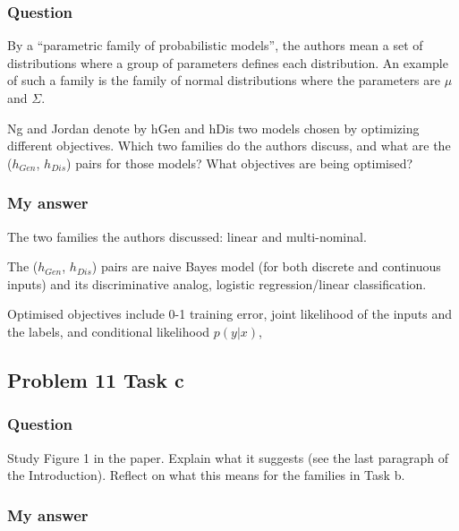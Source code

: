 \documentclass[
]{article}
\begin{document}
\hypertarget{question-6}{%
\subsubsection{Question}\label{question-6}}

By a ``parametric family of probabilistic models'', the authors mean a
set of distributions where a group of parameters defines each
distribution. An example of such a family is the family of normal
distributions where the parameters are \(\mu\) and \(\Sigma\).

Ng and Jordan denote by hGen and hDis two models chosen by optimizing
different objectives. Which two families do the authors discuss, and
what are the (\(h_{Gen}\), \(h_{Dis}\)) pairs for those models? What
objectives are being optimised?

\hypertarget{my-answer-6}{%
\subsubsection{My answer}\label{my-answer-6}}

The two families the authors discussed: linear and multi-nominal.

The (\(h_{Gen}\), \(h_{Dis}\)) pairs are naive Bayes model (for both
discrete and continuous inputs) and its discriminative analog, logistic
regression/linear classification.

Optimised objectives include 0-1 training error, joint likelihood of the
inputs and the labels, and conditional likelihood \(p(y|x)\),

\hypertarget{problem-11-task-c}{%
\subsection{Problem 11 Task c}\label{problem-11-task-c}}

\hypertarget{question-7}{%
\subsubsection{Question}\label{question-7}}

Study Figure 1 in the paper. Explain what it suggests (see the last
paragraph of the Introduction). Reflect on what this means for the
families in Task b.

\hypertarget{my-answer-7}{%
\subsubsection{My answer}\label{my-answer-7}}
\end{document}
